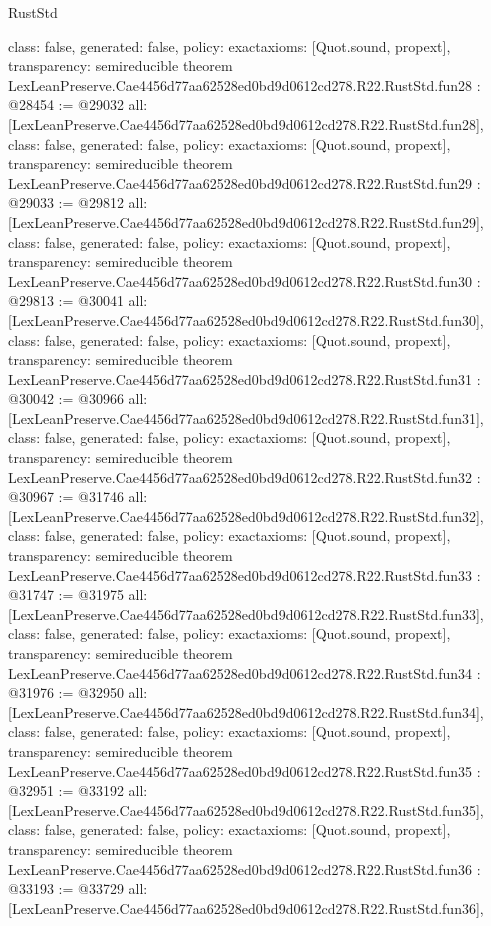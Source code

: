 \begin{lexlean}{RustStd}
\begin{coremodule}
{  class: false,
  generated: false,
  policy: exact{axioms: [Quot.sound, propext]},
  transparency: semireducible
}
theorem LexLeanPreserve.Cae4456d77aa62528ed0bd9d0612cd278.R22.RustStd.fun28 : @28454 := @29032 {
  all: [LexLeanPreserve.Cae4456d77aa62528ed0bd9d0612cd278.R22.RustStd.fun28],
  class: false,
  generated: false,
  policy: exact{axioms: [Quot.sound, propext]},
  transparency: semireducible
}
theorem LexLeanPreserve.Cae4456d77aa62528ed0bd9d0612cd278.R22.RustStd.fun29 : @29033 := @29812 {
  all: [LexLeanPreserve.Cae4456d77aa62528ed0bd9d0612cd278.R22.RustStd.fun29],
  class: false,
  generated: false,
  policy: exact{axioms: [Quot.sound, propext]},
  transparency: semireducible
}
theorem LexLeanPreserve.Cae4456d77aa62528ed0bd9d0612cd278.R22.RustStd.fun30 : @29813 := @30041 {
  all: [LexLeanPreserve.Cae4456d77aa62528ed0bd9d0612cd278.R22.RustStd.fun30],
  class: false,
  generated: false,
  policy: exact{axioms: [Quot.sound, propext]},
  transparency: semireducible
}
theorem LexLeanPreserve.Cae4456d77aa62528ed0bd9d0612cd278.R22.RustStd.fun31 : @30042 := @30966 {
  all: [LexLeanPreserve.Cae4456d77aa62528ed0bd9d0612cd278.R22.RustStd.fun31],
  class: false,
  generated: false,
  policy: exact{axioms: [Quot.sound, propext]},
  transparency: semireducible
}
theorem LexLeanPreserve.Cae4456d77aa62528ed0bd9d0612cd278.R22.RustStd.fun32 : @30967 := @31746 {
  all: [LexLeanPreserve.Cae4456d77aa62528ed0bd9d0612cd278.R22.RustStd.fun32],
  class: false,
  generated: false,
  policy: exact{axioms: [Quot.sound, propext]},
  transparency: semireducible
}
theorem LexLeanPreserve.Cae4456d77aa62528ed0bd9d0612cd278.R22.RustStd.fun33 : @31747 := @31975 {
  all: [LexLeanPreserve.Cae4456d77aa62528ed0bd9d0612cd278.R22.RustStd.fun33],
  class: false,
  generated: false,
  policy: exact{axioms: [Quot.sound, propext]},
  transparency: semireducible
}
theorem LexLeanPreserve.Cae4456d77aa62528ed0bd9d0612cd278.R22.RustStd.fun34 : @31976 := @32950 {
  all: [LexLeanPreserve.Cae4456d77aa62528ed0bd9d0612cd278.R22.RustStd.fun34],
  class: false,
  generated: false,
  policy: exact{axioms: [Quot.sound, propext]},
  transparency: semireducible
}
theorem LexLeanPreserve.Cae4456d77aa62528ed0bd9d0612cd278.R22.RustStd.fun35 : @32951 := @33192 {
  all: [LexLeanPreserve.Cae4456d77aa62528ed0bd9d0612cd278.R22.RustStd.fun35],
  class: false,
  generated: false,
  policy: exact{axioms: [Quot.sound, propext]},
  transparency: semireducible
}
theorem LexLeanPreserve.Cae4456d77aa62528ed0bd9d0612cd278.R22.RustStd.fun36 : @33193 := @33729 {
  all: [LexLeanPreserve.Cae4456d77aa62528ed0bd9d0612cd278.R22.RustStd.fun36],
}
\end{coremodule}
\end{lexlean}
